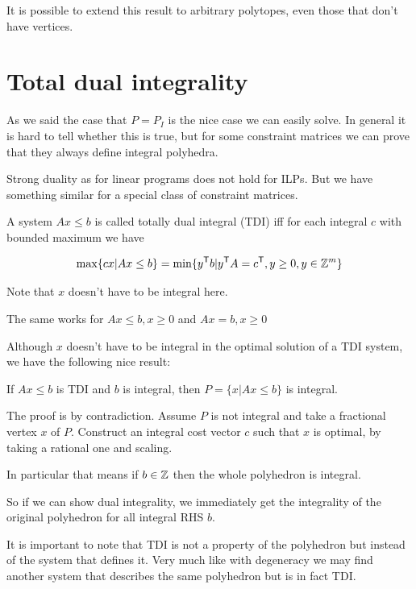 It is possible to extend this result to arbitrary polytopes, even those that don't have vertices.


\section{Total dual integrality}

As we said the case that $P=P_I$ is the nice case we can easily solve. In general it is hard to tell whether this is true, but for some constraint matrices we can prove that they always define integral polyhedra.

Strong duality as for linear programs does not hold for ILPs. But we have something similar for a special class of constraint matrices.

\begin{Def} A system $Ax\leq b$ is called totally dual integral (TDI) iff for each integral $c$ with bounded maximum we have

\[\max \{cx |Ax\leq b\} = \min \{{y}^\text{\upshape \sffamily T} b | {y}^\text{\upshape \sffamily T} A = {c}^\text{\upshape \sffamily T}, y\geq 0, y\in \mathbb{Z}^m\}\]

Note that $x$ doesn't have to be integral here.

The same works for $Ax\leq b, x\geq 0$ and $Ax=b, x\geq 0$
\end{Def}

Although $x$ doesn't have to be integral in the optimal solution of a TDI system, we have the following nice result:

\begin{thm} If $Ax\leq b$ is TDI and $b$ is integral, then $P=\{x|Ax\leq b\}$ is integral.
\end{thm}

\begin{pr} The proof is by contradiction. Assume $P$ is not integral and take a fractional vertex $x$ of $P$. Construct an integral cost vector $c$ such that $x$ is optimal, by taking a rational one and scaling.

In particular that means if $b\in \mathbb{Z}$ then the whole polyhedron is integral.
\end{pr}

So if we can show dual integrality, we immediately get the integrality of the original polyhedron for all integral RHS $b$.

It is important to note that TDI is not a property of the polyhedron but instead of the system that defines it. Very much like with degeneracy we may find another system that describes the same polyhedron but is in fact TDI. 

